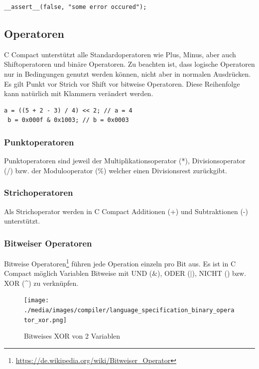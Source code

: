 \begin{lstlisting}[language=CMM]
__assert__(false, "some error occured");
\end{lstlisting}

\newpage
\subsection{Operatoren}

C Compact unterst\"utzt alle Standardoperatoren wie Plus, Minus, aber auch Shiftoperatoren und binäre Operatoren. Zu beachten ist, dass logische Operatoren nur in Bedingungen genutzt werden k\"onnen, nicht aber in normalen Ausdr\"ucken. Es gilt Punkt vor Strich vor Shift vor bitweise Operatoren. Diese Reihenfolge kann nat\"urlich mit Klammern ver\"andert werden.

\begin{lstlisting}[language=CMM]
 a = ((5 + 2 - 3) / 4) << 2; // a = 4
 b = 0x000f & 0x1003; // b = 0x0003
\end{lstlisting}

\subsubsection{Punktoperatoren}

Punktoperatoren sind jeweil der Multiplikationsoperator (*), Divisionsoperator (/) bzw. der Modulooperator (\%) welcher einen Divisionsrest zur\"uckgibt.

\subsubsection{Strichoperatoren}

Als Strichoperator werden in C Compact Additionen (+) und Subtraktionen (-) unterst\"utzt.

\subsubsection{Bitweiser Operatoren}

Bitweise Operatoren\footnote{\url{https://de.wikipedia.org/wiki/Bitweiser_Operator}} f\"uhren jede Operation einzeln pro Bit aus. Es ist in C Compact m\"oglich Variablen Bitweise mit UND ($\&$), ODER ($|$), NICHT (\raisebox{-0.9ex}{\~{ }}) bzw. 
XOR (\^{}) zu verkn\"upfen.

\begin{figure}[h]
\centering
\texttt{[image: ./media/images/compiler/language\_specification\_binary\_operator\_xor.png]}
\caption{Bitweises XOR von 2 Variablen}
\label{language_specification_binary_operator_xor}
\end{figure}

